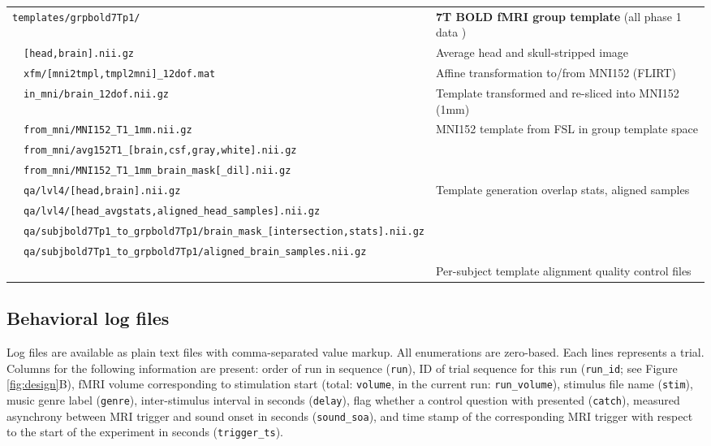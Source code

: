 \documentclass[10pt,a4paper,twocolumn]{article}
\begin{document}
\begin{table}[p]
\begin{tabular}{p{2mm}p{65mm}p{95mm}}
    \midrule
    \multicolumn{2}{l}{\texttt{templates/grpbold7Tp1/}} & \textbf{7T BOLD fMRI group template} (all phase 1 data )\\
    &   \texttt{[head,brain].nii.gz} & Average head and skull-stripped image\\
    &   \texttt{xfm/[mni2tmpl,tmpl2mni]\_12dof.mat} & Affine transformation to/from MNI152 (FLIRT)\\
    &   \texttt{in\_mni/brain\_12dof.nii.gz} & Template transformed and re-sliced into MNI152 (1mm)\\
    &   \texttt{from\_mni/MNI152\_T1\_1mm.nii.gz} & MNI152 template from FSL in group template space \\
    &   \texttt{from\_mni/avg152T1\_[brain,csf,gray,white].nii.gz} \\
    &   \texttt{from\_mni/MNI152\_T1\_1mm\_brain\_mask[\_dil].nii.gz} \\
    &   \texttt{qa/lvl4/[head,brain].nii.gz} & Template generation overlap stats, aligned samples \\
    &   \texttt{qa/lvl4/[head\_avgstats,aligned\_head\_samples].nii.gz} \\
    &   \texttt{qa/subjbold7Tp1\_to\_grpbold7Tp1/brain\_mask\_[intersection,stats].nii.gz} \\
    &   \texttt{qa/subjbold7Tp1\_to\_grpbold7Tp1/aligned\_brain\_samples.nii.gz} \\
    & & Per-subject template alignment quality control files \\
    \bottomrule
  \end{tabular}
  \label{tab:dslayout}
\end{table}

%

\subsection*{Behavioral log files}

Log files are available as plain text files with comma-separated value markup.
All enumerations are zero-based. Each lines represents a trial. Columns for the
following information are present: order of run in sequence (\texttt{run}), ID
of trial sequence for this run (\texttt{run\_id}; see Figure
\ref{fig:design}B), fMRI volume corresponding to stimulation start (total:
\texttt{volume}, in the current run: \texttt{run\_volume}), stimulus file name
(\texttt{stim}), music genre label (\texttt{genre}), inter-stimulus interval in
seconds (\texttt{delay}), flag whether a control question with presented
(\texttt{catch}), measured asynchrony between MRI trigger and sound onset in
seconds (\texttt{sound\_soa}), and time stamp of the corresponding MRI trigger
with respect to the start of the experiment in seconds (\texttt{trigger\_ts}).
\end{document}
